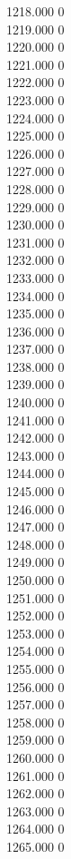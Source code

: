 { 1218.000	0 \\
 1219.000	0 \\
 1220.000	0 \\
 1221.000	0 \\
 1222.000	0 \\
 1223.000	0 \\
 1224.000	0 \\
 1225.000	0 \\
 1226.000	0 \\
 1227.000	0 \\
 1228.000	0 \\
 1229.000	0 \\
 1230.000	0 \\
 1231.000	0 \\
 1232.000	0 \\
 1233.000	0 \\
 1234.000	0 \\
 1235.000	0 \\
 1236.000	0 \\
 1237.000	0 \\
 1238.000	0 \\
 1239.000	0 \\
 1240.000	0 \\
 1241.000	0 \\
 1242.000	0 \\
 1243.000	0 \\
 1244.000	0 \\
 1245.000	0 \\
 1246.000	0 \\
 1247.000	0 \\
 1248.000	0 \\
 1249.000	0 \\
 1250.000	0 \\
 1251.000	0 \\
 1252.000	0 \\
 1253.000	0 \\
 1254.000	0 \\
 1255.000	0 \\
 1256.000	0 \\
 1257.000	0 \\
 1258.000	0 \\
 1259.000	0 \\
 1260.000	0 \\
 1261.000	0 \\
 1262.000	0 \\
 1263.000	0 \\
 1264.000	0 \\
 1265.000	0 \\
}
